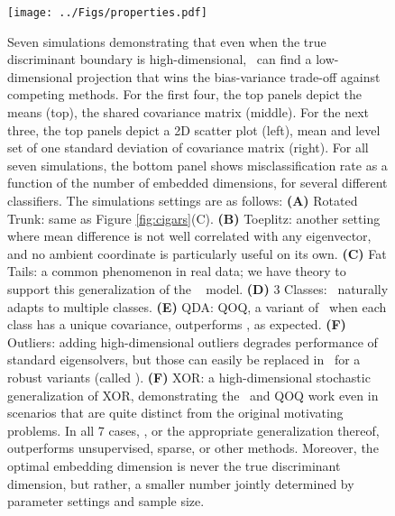 \documentclass[10pt]{article}
\begin{document}
\begin{figure}[h!]
\centering
\texttt{[image: ../Figs/properties.pdf]}
\caption{
Seven simulations demonstrating that even when the true discriminant boundary is high-dimensional, \Lol~can find a low-dimensional projection that wins the bias-variance trade-off against competing methods.  
For the first four, the top panels depict the means (top), the shared covariance matrix (middle).  For the next three, the top panels depict a 2D scatter plot (left), mean and level set of one standard deviation of covariance matrix (right).  For all seven simulations, the bottom panel shows misclassification rate as a function of the number of embedded dimensions, for several different classifiers.  The simulations settings are as follows:
\textbf{(A)} Rotated Trunk: same as Figure \ref{fig:cigars}(C).
\textbf{(B)} Toeplitz: another setting where mean difference is not well correlated with any eigenvector, and no ambient coordinate is particularly useful on its own.
\textbf{(C)} Fat Tails: a common phenomenon in real data; we have theory to support this generalization of the \Lda~ model.
\textbf{(D)} 3 Classes: \Lol~naturally adapts to multiple classes.
\textbf{(E)} QDA: QOQ, a variant of \Lol~when each class has a unique covariance, outperforms \Lol, as expected.
\textbf{(F)} Outliers: adding high-dimensional outliers degrades performance of standard eigensolvers, but those can easily be replaced in \Lol~for a robust variants (called \Lrl).
\textbf{(F)} XOR: a high-dimensional stochastic generalization of XOR, demonstrating the \Lol~and QOQ work even in scenarios that are quite distinct from the original motivating problems.
In all 7 cases, \Lol, or the appropriate generalization thereof, outperforms unsupervised, sparse, or other methods.  Moreover, the optimal embedding dimension is never the true discriminant dimension, but rather, a smaller number jointly determined by parameter settings and sample size.
}
\label{fig:properties}
\end{figure}
\end{document}
